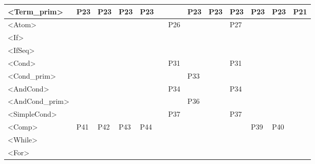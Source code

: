 \documentclass[12pt]{article}
\begin{document}
\begin{table}[H]
\begin{tabular}{|l|l|l|l|l|l|l|l|l|l|l|l|l|}
		\textless{}Term\_prim\textgreater{}      & P23            & P23          & P23         & P23                       &    &     & P23 & P23 & P23 & P23 & P23             & P21 \\ \hline
		\textless{}Atom\textgreater{}            &                &              &             &                           &    & P26 &     &     & P27 &     &                 &     \\ \hline
		\textless{}If\textgreater{}              &                &              &             &                           &    &     &     &     &     &     &                 &     \\ \hline
		\textless{}IfSeq\textgreater{}           &                &              &             &                           &    &     &     &     &     &     &                 &     \\ \hline
		\textless{}Cond\textgreater{}            &                &              &             &                           &    & P31 &     &     & P31 &     &                 &     \\ \hline
		\textless{}Cond\_prim\textgreater{}      &                &              &             &                           &    &     & P33 &     &     &     &                 &     \\ \hline
		\textless{}AndCond\textgreater{}         &                &              &             &                           &    & P34 &     &     & P34 &     &                 &     \\ \hline
		\textless{}AndCond\_prim\textgreater{}   &                &              &             &                           &    &     & P36 &     &     &     &                 &     \\ \hline
		\textless{}SimpleCond\textgreater{}      &                &              &             &                           &    & P37 &     &     & P37 &     &                 &     \\ \hline
		\textless{}Comp\textgreater{}            & P41            & P42          & P43         & P44                       &    &     &     &     &     & P39 & P40             &     \\ \hline
		\textless{}While\textgreater{}           &                &              &             &                           &    &     &     &     &     &     &                 &     \\ \hline
		\textless{}For\textgreater{}             &                &              &             &                           &    &     &     &     &     &     &                 &     \\ \hline

\end{tabular}
\end{table}
\end{document}
